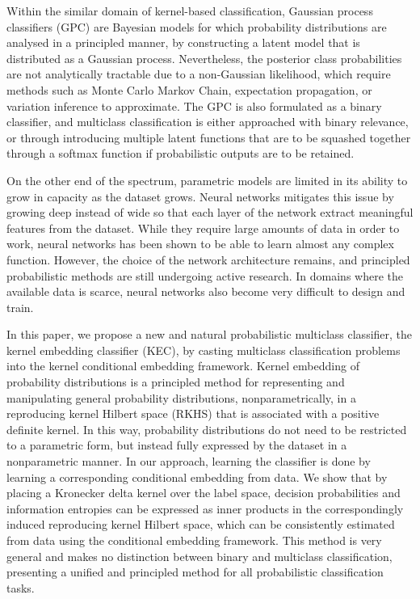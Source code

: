 \documentclass{article}
\begin{document}
	Within the similar domain of kernel-based classification, Gaussian process classifiers (GPC) \citep{rasmussen2006gaussian} are Bayesian models for which probability distributions are analysed in a principled manner, by constructing a latent model that is distributed as a Gaussian process. Nevertheless, the posterior class probabilities are not analytically tractable due to a non-Gaussian likelihood, which require methods such as Monte Carlo Markov Chain, expectation propagation, or variation inference to approximate. The GPC is also formulated as a binary classifier, and multiclass classification is either approached with binary relevance, or through introducing multiple latent functions that are to be squashed together through a softmax function if probabilistic outputs are to be retained.
	
	On the other end of the spectrum, parametric models are limited in its ability to grow in capacity as the dataset grows. Neural networks \citep{lecun2015deep} mitigates this issue by growing deep instead of wide so that each layer of the network extract meaningful features from the dataset. While they require large amounts of data in order to work, neural networks has been shown to be able to learn almost any complex function. However, the choice of the network architecture remains, and principled probabilistic methods are still undergoing active research. In domains where the available data is scarce, neural networks also become very difficult to design and train.
	
	In this paper, we propose a new and natural probabilistic multiclass classifier, the kernel embedding classifier (KEC), by casting multiclass classification problems into the kernel conditional embedding framework. Kernel embedding of probability distributions is a principled method for representing and manipulating general probability distributions, nonparametrically, in a reproducing kernel Hilbert space (RKHS) that is associated with a positive definite kernel. In this way, probability distributions do not need to be restricted to a parametric form, but instead fully expressed by the dataset in a nonparametric manner. In our approach, learning the classifier is done by learning a corresponding conditional embedding from data. We show that by placing a Kronecker delta kernel over the label space, decision probabilities and information entropies can be expressed as inner products in the correspondingly induced reproducing kernel Hilbert space, which can be consistently estimated from data using the conditional embedding framework. This method is very general and makes no distinction between binary and multiclass classification, presenting a unified and principled method for all probabilistic classification tasks.
	
\end{document}
